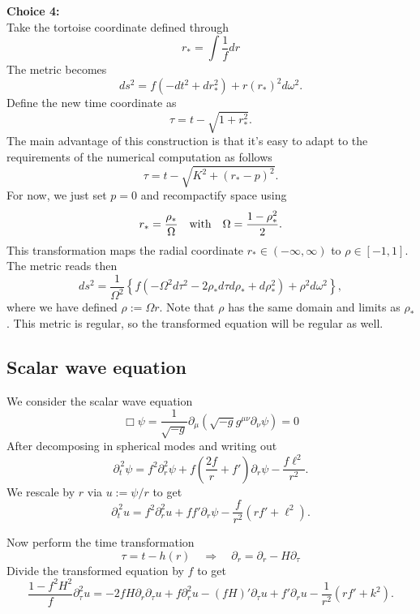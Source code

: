 \documentclass[a4paper]{article}
\begin{document}
{\bf Choice 4:}\\
Take the tortoise coordinate defined through
\[ r_\ast = \int\frac{1}{f}dr \]
The metric becomes 
\[ ds^2 = f \left( -dt^2 + dr_\ast^2\right) + r(r_\ast)^2 d\omega^2. \]
Define the new time coordinate as 
\[ \tau = t - \sqrt{1+r_\ast^2}. \]
The main advantage of this construction is that it's easy to adapt to the requirements of the numerical computation as follows
\[ \tau = t - \sqrt{K^2+(r_\ast-p)^2}. \]
For now, we just set $p=0$ and recompactify space using
\[ r_\ast  = \frac{\rho_\ast}{\Omega} \quad \rm{with} \quad \Omega = \frac{1-\rho_\ast^2}{2}.\]
This transformation maps the radial coordinate $r_\ast\in(-\infty,\infty)$ to $\rho\in[-1,1]$. The metric reads then
\[  ds^2 =  \frac{1}{\Omega^2} \left\{ f\left(-\Omega^2 d\tau^2 - 2 \rho_\ast d\tau d\rho_\ast +  d\rho_\ast^2\right) + \rho^2 d\omega^2 \right\}, \] 
where we have defined $\rho :=  \Omega r$. Note that $\rho$ has the same domain and limits as $\rho_\ast$. This metric is regular, so the transformed equation will be regular as well.

\subsection*{Scalar wave equation}
We consider the scalar wave equation
\[ \Box \psi = \frac{1}{\sqrt{-g}} \partial_\mu \left(\sqrt{-g} g^{\mu\nu} \partial_\nu \psi \right) = 0  \]
After decomposing in spherical modes and writing out
\[ \partial_{{t}}^{\,2}\psi  = f^2 \partial_r^2 \psi + f \left(\frac{2f}{r}+f'\right) \partial_r \psi - \frac{f \ell^2}{r^2}. \]
We rescale by $r$ via $u:=\psi/r$ to get
\[ \partial_{{t}}^{\,2}u  = f^2 \partial_r^2 u + f f' \partial_r \psi - \frac{f}{r^2} (r f' + \ell^2). \]

Now perform the time transformation
\[ \tau = t-h(r) \quad \Rightarrow \quad \partial_r = \partial_r - H \partial_\tau \]
Divide the transformed equation by $f$ to get
\[ \frac{1-f^2H^2}{f} \partial_\tau^2 u = - 2 fH \partial_r\partial_\tau u + f \partial_r^2 u - (f H)' \partial_\tau u + f'\partial_r u -\frac{1}{r^2} (r f' + k^2 ). \]
\end{document}

